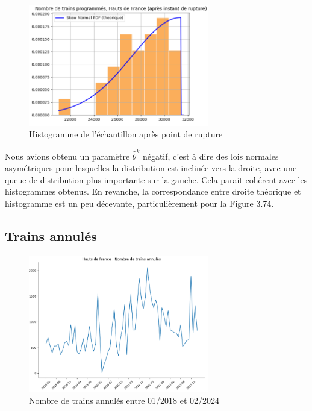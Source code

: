 {\begin{figure}[H]
  \centering
  \includegraphics[width=0.7\textwidth]{HF_TP_5.png}
  \caption{Histogramme de l'échantillon après point de rupture}
\end{figure}

Nous avions obtenu un paramètre $\hat{\theta}^k$ négatif, c'est à dire des lois normales asymétriques pour lesquelles la distribution est inclinée vers la droite, avec une queue de distribution plus importante sur la gauche. Cela parait cohérent avec les histogrammes obtenus.
En revanche, la correspondance entre droite théorique et histogramme est un peu décevante, particulièrement pour la Figure 3.74.

\subsection{Trains annulés}

\begin{figure}[H]
  \centering
  \includegraphics[width=0.7\textwidth]{HF_TA_1.png}
  \caption{Nombre de trains annulés entre 01/2018 et 02/2024}
\end{figure}

}
